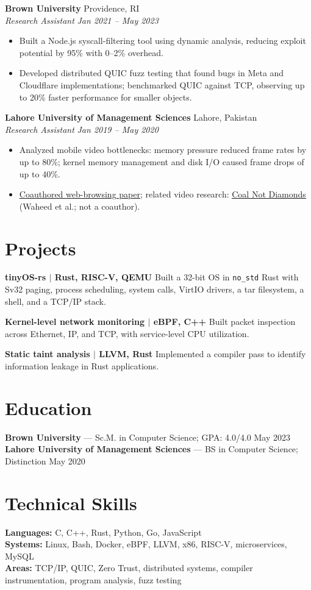 \documentclass[letterpaper,10pt]{article}
\newcommand{\role}[4]{\textbf{#1} \hfill #2\\\textit{#3} \hfill \textit{#4}\par}
\newcommand{\project}[2]{\textbf{#1} #2\par\vspace{2pt}}
\begin{document}
\vspace{2pt}
\role{Brown University}{Providence, RI}{Research Assistant}{Jan 2021 -- May 2023}
\begin{itemize}
\item Built a Node.js syscall-filtering tool using dynamic analysis, reducing exploit potential by 95\% with 0--2\% overhead.
\item Developed distributed QUIC fuzz testing that found bugs in Meta and Cloudflare implementations; benchmarked QUIC against TCP, observing up to 20\% faster performance for smaller objects.
\end{itemize}
\vspace{2pt}
\role{Lahore University of Management Sciences}{Lahore, Pakistan}{Research Assistant}{Jan 2019 -- May 2020}
\begin{itemize}
\item Analyzed mobile video bottlenecks: memory pressure reduced frame rates by up to 80\%; kernel memory management and disk I/O caused frame drops of up to 40\%.
\item \href{https://cs.brown.edu/people/tab/papers/CCR20.pdf}{\underline{Coauthored web-browsing paper}}; related video research: \href{https://talha.cs.illinois.edu/files/coal-not-diamonds.pdf}{\underline{Coal Not Diamonds}} (Waheed et al.; not a coauthor).
\end{itemize}
\section{Projects}
\project{tinyOS-rs $|$ Rust, RISC-V, QEMU}{Built a 32-bit OS in \texttt{no\_std} Rust with Sv32 paging, process scheduling, system calls, VirtIO drivers, a tar filesystem, a shell, and a TCP/IP stack.}
\project{Kernel-level network monitoring $|$ eBPF, C++}{Built packet inspection across Ethernet, IP, and TCP, with service-level CPU utilization.}
\project{Static taint analysis $|$ LLVM, Rust}{Implemented a compiler pass to identify information leakage in Rust applications.}
\section{Education}
\textbf{Brown University} --- Sc.M. in Computer Science; GPA: 4.0/4.0 \hfill May 2023\\
\textbf{Lahore University of Management Sciences} --- BS in Computer Science; Distinction \hfill May 2020
\section{Technical Skills}
\textbf{Languages:} C, C++, Rust, Python, Go, JavaScript\\
\textbf{Systems:} Linux, Bash, Docker, eBPF, LLVM, x86, RISC-V, microservices, MySQL\\
\textbf{Areas:} TCP/IP, QUIC, Zero Trust, distributed systems, compiler instrumentation, program analysis, fuzz testing
\end{document}
